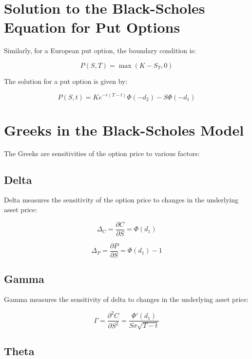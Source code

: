 \documentclass[../Main.tex]{subfiles}
\begin{document}
	
	\section{Solution to the Black-Scholes Equation for Put Options}
	
	Similarly, for a European put option, the boundary condition is:
	
	\begin{equation}
		P(S, T) = \max(K - S_T, 0)
	\end{equation}
	
	The solution for a put option is given by:
	
	\begin{equation}
		P(S, t) = K e^{-r(T-t)} \Phi(-d_2) - S \Phi(-d_1)
	\end{equation}
	
	\section{Greeks in the Black-Scholes Model}
	
	The Greeks are sensitivities of the option price to various factors:
	
	\subsection{Delta}
	
	Delta measures the sensitivity of the option price to changes in the underlying asset price:
	
	\begin{equation}
		\Delta_C = \frac{\partial C}{\partial S} = \Phi(d_1)
	\end{equation}
	
	\begin{equation}
		\Delta_P = \frac{\partial P}{\partial S} = \Phi(d_1) - 1
	\end{equation}
	
	\subsection{Gamma}
	
	Gamma measures the sensitivity of delta to changes in the underlying asset price:
	
	\begin{equation}
		\Gamma = \frac{\partial^2 C}{\partial S^2} = \frac{\Phi'(d_1)}{S \sigma \sqrt{T - t}}
	\end{equation}
	
	\subsection{Theta}
	
\end{document}

